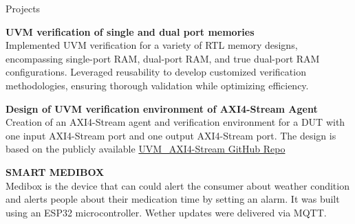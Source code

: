 \documentclass[
	11pt, %
]{./../assets/resume} %
\begin{document}
\begin{rSection}{Projects}

	\textbf{UVM verification of single and dual port memories} \\
	Implemented UVM verification for a variety of RTL memory designs, encompassing single-port RAM, dual-port RAM, and true dual-port RAM configurations. Leveraged reusability to develop customized verification methodologies, ensuring thorough validation while optimizing efficiency.

	\textbf{Design of UVM verification environment of AXI4-Stream Agent} \\ 
	Creation of an AXI4-Stream agent and verification environment for a DUT with one input AXI4-Stream port and one output AXI4-Stream port. The design is based on the publicly available \href{https://github.com/makararasi/UVM_AXI4-Stream}{UVM\_AXI4-Stream GitHub Repo}

	\textbf{SMART MEDIBOX} \\
	Medibox is the device that can could alert the consumer about weather condition and alerts people about their medication time by setting an alarm. It was built using an ESP32 microcontroller. Wether updates were delivered via MQTT.

\end{rSection}







\end{document}
